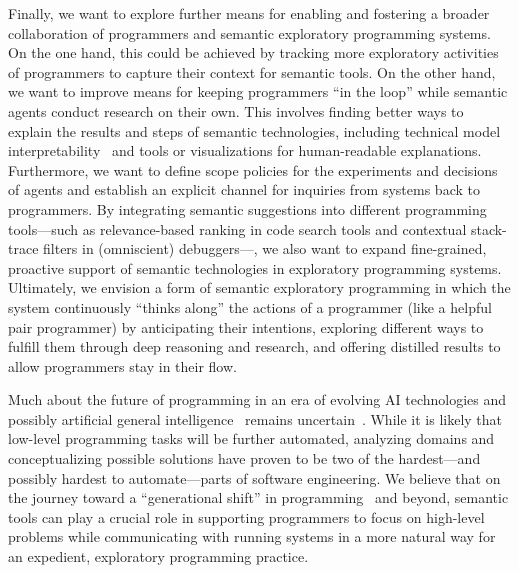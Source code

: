Finally, we want to explore further means for enabling and fostering a broader collaboration of programmers and semantic exploratory programming systems.
On the one hand, this could be achieved by tracking more exploratory activities of programmers to capture their context for semantic tools.
On the other hand, we want to improve means for keeping programmers ``in the loop'' while semantic agents conduct research on their own.
This involves finding better ways to explain the results and steps of semantic technologies, including technical model interpretability~\cite{chefer2021generic} and tools or visualizations for human-readable explanations.
Furthermore, we want to define scope policies for the experiments and decisions of agents and establish an explicit channel for inquiries from systems back to programmers.
By integrating semantic suggestions into different programming tools---such as relevance-based ranking in code search tools and contextual stack-trace filters in (omniscient) debuggers---, we also want to expand fine-grained, proactive support of semantic technologies in exploratory programming systems.
Ultimately, we envision a form of semantic exploratory programming in which the system continuously ``thinks along'' the actions of a programmer (like a helpful pair programmer) by anticipating their intentions, exploring different ways to fulfill them through deep reasoning and research, and offering distilled results to allow programmers stay in their flow.

\ParSep

Much about the future of programming in an era of evolving AI technologies and possibly artificial general intelligence~\cite{bubeck2023sparks} remains uncertain~\cite{tanimoto2023five}.
While it is likely that low-level programming tasks will be further automated, analyzing domains and conceptualizing possible solutions have proven to be two of the hardest---and possibly hardest to automate---parts of software engineering.
We believe that on the journey toward a ``generational shift'' in programming~\cite{sarkar2023code} and beyond, semantic tools can play a crucial role in supporting programmers to focus on high-level problems while communicating with running systems in a more natural way for an expedient, exploratory programming practice.
